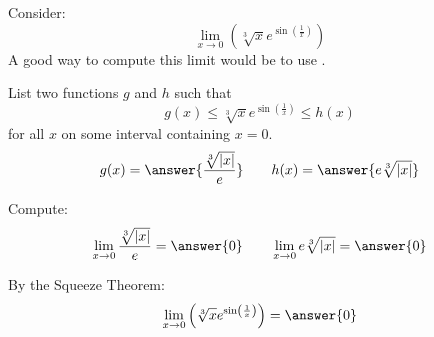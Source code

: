 \documentclass{ximera}
\author{Bart Snapp}
\begin{document}
\begin{exercise}


Consider:
\[
\lim_{x\to 0} \left(\sqrt[3]{x} e^{\sin \left(\frac{1}{x}\right)}\right)
\]
A good way to compute this limit would be to use .
\begin{exercise}
List two functions $g$ and $h$ such that
\[
g(x)\le \sqrt[3]{x} e^{\sin \left(\frac{1}{x}\right)} \le h(x)
\]
for all $x$ on some interval containing $x=0$.
\[
g(x)=\answer{\frac{\sqrt[3]{\left| x\right| }}{e}}\qquad h(x) =\answer{e \sqrt[3]{\left| x\right| }}
\]
\begin{exercise}
Compute:
\[
\lim_{x \to 0}\frac{\sqrt[3]{\left| x\right| }}{e} = \answer{0}\qquad \lim_{x\to 0}e \sqrt[3]{\left| x\right| } = \answer{0}
\]
\begin{exercise}
By the Squeeze Theorem:
\[
\lim_{x\to 0} \left(\sqrt[3]{x} e^{\sin \left(\frac{1}{x}\right)}\right) = \answer{0}
\]
\end{exercise}
\end{exercise}
\end{exercise}
\end{exercise}
\end{document}
